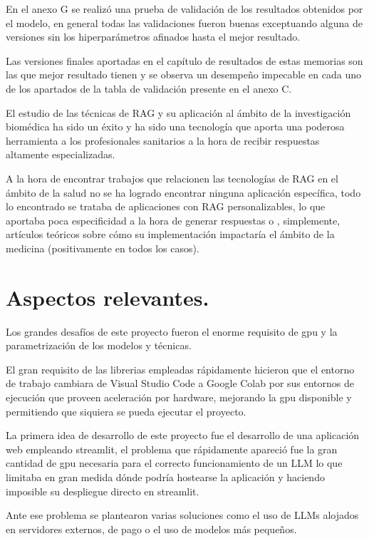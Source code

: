 En el anexo G se realizó una prueba de validación de los resultados obtenidos por el modelo, en general todas las validaciones fueron buenas exceptuando alguna de versiones sin los hiperparámetros afinados hasta el mejor resultado.

Las versiones finales aportadas en el capítulo de resultados de estas memorias son las que mejor resultado tienen y se observa un desempeño impecable en cada uno de los apartados de la tabla de validación presente en el anexo C.

El estudio de las técnicas de RAG y su aplicación al ámbito de la investigación biomédica ha sido un éxito y ha sido una tecnología que aporta una poderosa herramienta a los profesionales sanitarios a la hora de recibir respuestas altamente especializadas.

A la hora de encontrar trabajos que relacionen las tecnologías de RAG en el ámbito de la salud no se ha logrado encontrar ninguna aplicación específica, todo lo encontrado se trataba de aplicaciones con RAG personalizables, lo que aportaba poca especificidad a la hora de generar respuestas o , simplemente, artículos teóricos sobre cómo su implementación impactaría el ámbito de la medicina (positivamente en todos los casos).

\section{Aspectos relevantes.}

Los grandes desafíos de este proyecto fueron el enorme requisito de gpu y la parametrización de los modelos y técnicas.

El gran requisito de las librerias empleadas rápidamente hicieron que el entorno de trabajo cambiara de Visual Studio Code a Google Colab por sus entornos de ejecución que proveen aceleración por hardware, mejorando la gpu disponible y permitiendo que siquiera se pueda ejecutar el proyecto.

La primera idea de desarrollo de este proyecto fue el desarrollo de una aplicación web empleando streamlit, el problema que rápidamente apareció fue la gran cantidad de gpu necesaria para el correcto funcionamiento de un LLM lo que limitaba en gran medida dónde podría hostearse la aplicación y haciendo imposible su despliegue directo en streamlit.

Ante ese problema se plantearon varias soluciones como el uso de LLMs alojados en servidores externos, de pago o el uso de modelos más pequeños.


